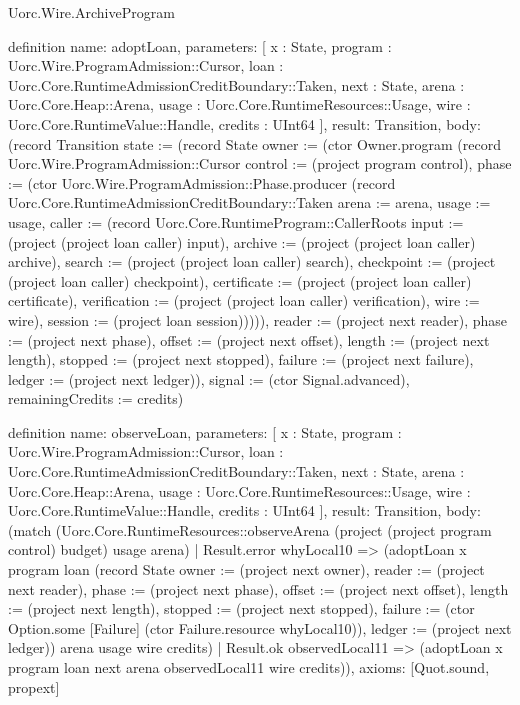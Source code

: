 \begin{lexlean}{Uorc.Wire.ArchiveProgram}
\begin{semanticmodule}
definition{
  name: adoptLoan,
  parameters: [
    x : State,
    program : Uorc.Wire.ProgramAdmission::Cursor,
    loan : Uorc.Core.RuntimeAdmissionCreditBoundary::Taken,
    next : State,
    arena : Uorc.Core.Heap::Arena,
    usage : Uorc.Core.RuntimeResources::Usage,
    wire : Uorc.Core.RuntimeValue::Handle,
    credits : UInt64
  ],
  result: Transition,
  body: (record Transition {state := (record State {owner := (ctor Owner.program (record Uorc.Wire.ProgramAdmission::Cursor {control := (project program control), phase := (ctor Uorc.Wire.ProgramAdmission::Phase.producer (record Uorc.Core.RuntimeAdmissionCreditBoundary::Taken {arena := arena, usage := usage, caller := (record Uorc.Core.RuntimeProgram::CallerRoots {input := (project (project loan caller) input), archive := (project (project loan caller) archive), search := (project (project loan caller) search), checkpoint := (project (project loan caller) checkpoint), certificate := (project (project loan caller) certificate), verification := (project (project loan caller) verification), wire := wire}), session := (project loan session)}))})), reader := (project next reader), phase := (project next phase), offset := (project next offset), length := (project next length), stopped := (project next stopped), failure := (project next failure), ledger := (project next ledger)}), signal := (ctor Signal.advanced), remainingCredits := credits})
}

definition{
  name: observeLoan,
  parameters: [
    x : State,
    program : Uorc.Wire.ProgramAdmission::Cursor,
    loan : Uorc.Core.RuntimeAdmissionCreditBoundary::Taken,
    next : State,
    arena : Uorc.Core.Heap::Arena,
    usage : Uorc.Core.RuntimeResources::Usage,
    wire : Uorc.Core.RuntimeValue::Handle,
    credits : UInt64
  ],
  result: Transition,
  body: (match (Uorc.Core.RuntimeResources::observeArena (project (project program control) budget) usage arena)
    | Result.error whyLocal10 => (adoptLoan x program loan (record State {owner := (project next owner), reader := (project next reader), phase := (project next phase), offset := (project next offset), length := (project next length), stopped := (project next stopped), failure := (ctor Option.some [Failure] (ctor Failure.resource whyLocal10)), ledger := (project next ledger)}) arena usage wire credits)
    | Result.ok observedLocal11 => (adoptLoan x program loan next arena observedLocal11 wire credits)),
  axioms: [Quot.sound, propext]
}


\end{semanticmodule}
\end{lexlean}
